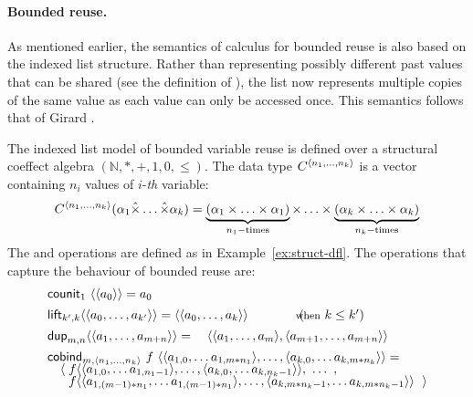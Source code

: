 \paragraph{Bounded reuse.}
As mentioned earlier, the semantics of calculus for bounded reuse is also based on the indexed list 
structure. Rather than representing possibly different past values that can be shared (see the 
definition of ), the list now represents multiple copies of the same value as each value
can only be accessed once. This semantics follows that of Girard \cite{logic-bounded}.

\begin{example}
The indexed list model of bounded variable reuse is defined over a structural coeffect
algebra $(\mathbb{N}, \ast, +, 1, 0, \leq)$. The data type $\ctyp{\langle n_1, \ldots, n_k\rangle}$ 
is a vector containing $n_i$ values of $i$-\textit{th} variable:
%
\begin{equation*}
C^{\langle n_1, \ldots, n_k\rangle}(\alpha_1 \hat{\times} \ldots \hat{\times} \alpha_k) = 
\underbrace{(\alpha_1 \times \ldots \times \alpha_1)}_{n_1-\textnormal{times}} \times \ldots \times
  \underbrace{(\alpha_k \times \ldots \times \alpha_k)}_{n_k-\textnormal{times}}
\end{equation*}
%
The  and  operations are defined as in Example~\ref{ex:struct-dfl}.
The operations that capture the behaviour of bounded reuse are:
%
\begin{equation*}
\begin{array}{l}
\textnormal{\sffamily counit}_{1}~\langle \langle a_0 \rangle \rangle = a_0
\\[0.45em]
\textnormal{\sffamily lift}_{k', k} \langle\langle a_0, \ldots, a_{k'} \rangle\rangle = 
  \langle\langle a_0, \ldots, a_k \rangle\rangle \qquad\qquad(\hspace{-0.95em}\textnormal{\footnotesize when}~k\leq k')
\\[0.45em]
\textnormal{\sffamily dup}_{m, n} \langle \langle a_1, \ldots, a_{m+n} \rangle \rangle = 
\quad \langle \langle a_1, \ldots, a_m \rangle, \langle a_{m+1}, \ldots, a_{m+n} \rangle \rangle
\\[0.45em]
\textnormal{\sffamily cobind}_{m, \langle n_1, \ldots, n_k \rangle}~f~
  \langle \langle a_{1,0}, \ldots a_{1,m\ast{n_1}} \rangle, \ldots, \langle a_{k,0}, \ldots a_{k,m\ast{n_k}} \rangle \rangle = \\[-0.25em]
\quad \langle\; f \langle \langle a_{1,0}, \ldots a_{1,{n_1 - 1}} \rangle, \ldots, \langle a_{k,0}, \ldots a_{k,{n_k - 1}} \rangle \rangle, ~\ldots~, \\[-0.25em]
\quad ~~ f \langle \langle a_{1,(m-1)\ast n_1}, \ldots a_{1,(m-1) \ast n_1} \rangle, \ldots, 
                   \langle a_{k,m\ast n_k - 1}, \ldots a_{k,m\ast n_k - 1} \rangle \rangle~\; \rangle
\end{array}
\end{equation*}
\end{example}

